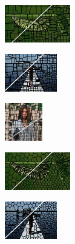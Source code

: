 \begin{figure}
\begin{subfigure}[b]{0.02\textwidth}
	\end{subfigure}
	\begin{subfigure}[b]{0.16\textwidth}
		\includegraphics[height=1.65cm]{pictures/bsds500/tps/cropped/tps_35028_contours}
	\end{subfigure}
	\begin{subfigure}[b]{0.129\textwidth}
		\includegraphics[height=1.65cm]{pictures/sbd/tps/cropped/tps_0004774_contours}
	\end{subfigure}
	\begin{subfigure}[b]{0.10\textwidth}
		\includegraphics[height=1.65cm]{pictures/fash/tps/cropped/tps_010_contours}
	\end{subfigure}
	\begin{subfigure}[b]{0.02\textwidth}
	\end{subfigure}
	\begin{subfigure}[b]{0.16\textwidth}
		\includegraphics[height=1.65cm]{pictures/bsds500/vc/cropped/vc_35028_contours}
	\end{subfigure}
	\begin{subfigure}[b]{0.129\textwidth}
		\includegraphics[height=1.65cm]{pictures/sbd/vc/cropped/vc_0004774_contours}
	\end{subfigure}
	\begin{subfigure}[b]{0.10\textwidth}

\end{subfigure}
\end{figure}
